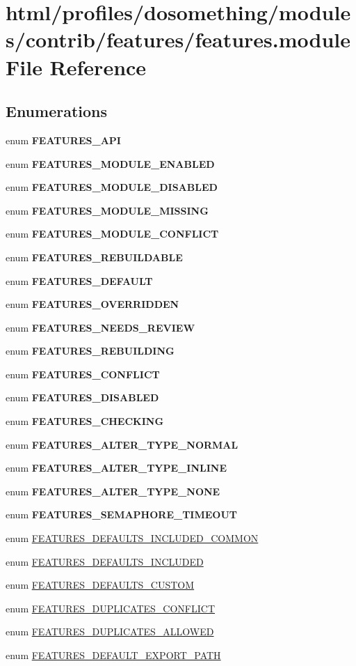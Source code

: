 \hypertarget{features_8module}{
\section{html/profiles/dosomething/modules/contrib/features/features.module File Reference}
\label{features_8module}
}
\subsection*{Enumerations}
\begin{DoxyCompactItemize}
\item 
enum {\bfseries FEATURES\_\-API} 
\item 
enum {\bfseries FEATURES\_\-MODULE\_\-ENABLED} 
\item 
enum {\bfseries FEATURES\_\-MODULE\_\-DISABLED} 
\item 
enum {\bfseries FEATURES\_\-MODULE\_\-MISSING} 
\item 
enum {\bfseries FEATURES\_\-MODULE\_\-CONFLICT} 
\item 
enum {\bfseries FEATURES\_\-REBUILDABLE} 
\item 
enum {\bfseries FEATURES\_\-DEFAULT} 
\item 
enum {\bfseries FEATURES\_\-OVERRIDDEN} 
\item 
enum {\bfseries FEATURES\_\-NEEDS\_\-REVIEW} 
\item 
enum {\bfseries FEATURES\_\-REBUILDING} 
\item 
enum {\bfseries FEATURES\_\-CONFLICT} 
\item 
enum {\bfseries FEATURES\_\-DISABLED} 
\item 
enum {\bfseries FEATURES\_\-CHECKING} 
\item 
enum {\bfseries FEATURES\_\-ALTER\_\-TYPE\_\-NORMAL} 
\item 
enum {\bfseries FEATURES\_\-ALTER\_\-TYPE\_\-INLINE} 
\item 
enum {\bfseries FEATURES\_\-ALTER\_\-TYPE\_\-NONE} 
\item 
enum {\bfseries FEATURES\_\-SEMAPHORE\_\-TIMEOUT} 
\item 
enum \hyperlink{features_8module_a7eb1ad8581b51a16f6bf1644f647342e}{FEATURES\_\-DEFAULTS\_\-INCLUDED\_\-COMMON} 
\item 
enum \hyperlink{features_8module_a92c2163fbee04cf83502aa6b7f1c259d}{FEATURES\_\-DEFAULTS\_\-INCLUDED} 
\item 
enum \hyperlink{features_8module_a1e60ef188014233e6c2f2f47d49b0207}{FEATURES\_\-DEFAULTS\_\-CUSTOM} 
\item 
enum \hyperlink{features_8module_a428c0bde0ed719decf70ed07ad640be8}{FEATURES\_\-DUPLICATES\_\-CONFLICT} 
\item 
enum \hyperlink{features_8module_a0a5a98e03aae74b4cdd0e28a2577361a}{FEATURES\_\-DUPLICATES\_\-ALLOWED} 
\item 
enum \hyperlink{features_8module_a29a3735e1ba70ad921c88f6d03dabe0f}{FEATURES\_\-DEFAULT\_\-EXPORT\_\-PATH} 
\end{DoxyCompactItemize}
